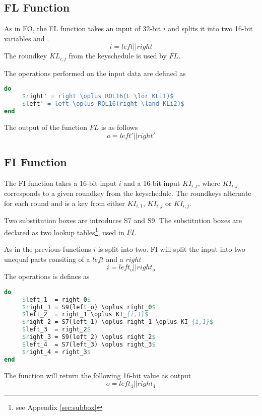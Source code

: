\subsection{FL Function}
As in FO, the FL function takes an input of 32-bit $i$ and splits it into two 16-bit variables  and .
\[i = left || right\]
The roundkey $KL_{i,j}$ from the keyschedule is used by $FL$.

The operations performed on the input data are defined as
\begin{lstlisting}[frame=single, language=Pascal, mathescape,captionpos=b, caption={Pseudo code for $FL$ function}]
do
     $right' = right \oplus ROL16(L \lor KLi1)$
     $left' = left \oplus ROL16(right \land KLi2)$
end
\end{lstlisting}
The output of the function $FL$ is as follows
\[o = left' || right'\]
\subsection{FI Function}
The FI function takes a 16-bit input $i$ and a 16-bit input $KI_{i,j}$,
where $KI_{i,j}$ corresponds to a given roundkey from the keyschedule. The
roundkeys alternate for each round and is a key from either $KI_{i,1}$, $KI_{i,j}$
or $KI_{i,j}$.

Two substitution boxes are introduces S7 and S9. The substitution
boxes are declared as two lookup tables\footnote{see Appendix
  \ref{sec:subbox}}, used in $FI$.

As in the previous functions $i$ is split into two. FI will split the
input into two unequal parts consiting of a  $left$ and a
 $right$
\[ i = left_o || right_o \]
The operations is defines as
\begin{lstlisting}[frame=single, language=Pascal, mathescape,
captionpos=b, caption={Pseudo code for $FI$ function}]
do
     $left_1  = right_0$
     $right_1 = S9(left_o) \oplus right_0$
     $left_2  = right_1 \oplus KI_{i,1}$
     $right_2 = S7(left_1) \oplus right_1 \oplus KI_{i,1}$
     $left_3  = right_2$
     $right_3 = S9(left_2) \oplus right_2$
     $left_4  = S7(left_3) \oplus right_3$
     $right_4 = right_3$
end
\end{lstlisting}
The function will return the following 16-bit value as output
\[o = left_4 || right_4\]

